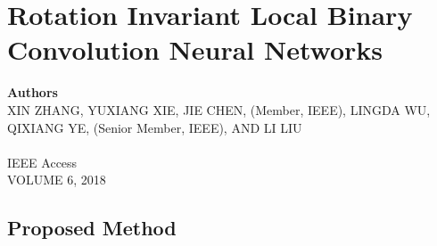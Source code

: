 \chapter{Rotation Invariant Local Binary Convolution Neural Networks}

{\small \textbf{Authors}\\
XIN ZHANG, YUXIANG XIE, JIE CHEN, (Member, IEEE), LINGDA WU, QIXIANG YE, (Senior Member, IEEE), AND LI LIU\\ \\
IEEE Access\\VOLUME 6, 2018}

\section{Proposed Method}
 
